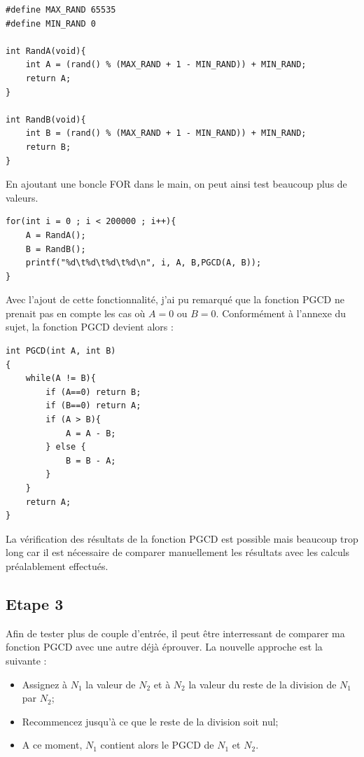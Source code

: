 \documentclass[a4paper]{article}
\begin{document}
\begin{lstlisting}[style=CStyle]
#define MAX_RAND 65535
#define MIN_RAND 0 

int RandA(void){
	int A = (rand() % (MAX_RAND + 1 - MIN_RAND)) + MIN_RAND;
    return A;
}

int RandB(void){
	int B = (rand() % (MAX_RAND + 1 - MIN_RAND)) + MIN_RAND;
    return B;
}
\end{lstlisting}
        En ajoutant une boncle FOR dans le main, on peut ainsi test beaucoup plus de valeurs.
\begin{lstlisting}[style=CStyle]
for(int i = 0 ; i < 200000 ; i++){
	A = RandA();
	B = RandB();
	printf("%d\t%d\t%d\t%d\n", i, A, B,PGCD(A, B));
}
\end{lstlisting}
        
        \newpage
        Avec l'ajout de cette fonctionnalité, j'ai pu remarqué que la fonction PGCD ne prenait pas en compte les cas où $A = 0$ ou $B = 0$.
        Conformément à l'annexe du sujet, la fonction PGCD devient alors :
\begin{lstlisting}[style=CStyle]
int PGCD(int A, int B)
{
	while(A != B){
		if (A==0) return B; 
		if (B==0) return A;
		if (A > B){
			A = A - B;
		} else {
			B = B - A;
		}
	}
	return A;
}
\end{lstlisting}
        La vérification des résultats de la fonction PGCD est possible mais beaucoup trop long car il est nécessaire de comparer manuellement les résultats avec les calculs préalablement effectués.
    
    \subsection{Etape 3}
        Afin de tester plus de couple d'entrée, il peut être interressant de comparer ma fonction PGCD avec une autre déjà éprouver.
        La nouvelle approche est la suivante :
        \begin{itemize}
            \item Assignez à $N_1$ la valeur de $N_2$ et à $N_2$ la valeur du reste de la division de $N_1$ par $N_2$;
            \item Recommencez jusqu'à ce que le reste de la division soit nul;
            \item A ce moment, $N_1$ contient alors le PGCD de $N_1$ et $N_2$.
        \end{itemize}
        
\end{document}
